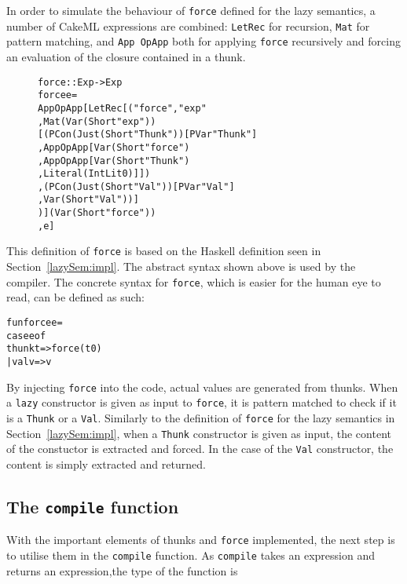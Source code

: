 In order to simulate the behaviour of \texttt{force} defined for the lazy
semantics, a number of CakeML expressions are combined:
\texttt{LetRec} for recursion, \texttt{Mat} for pattern
matching, and \texttt{App OpApp} both for applying \texttt{force} recursively
and forcing an evaluation of the closure contained in a thunk.

\begin{figure}[H]
\begin{alltt}
force :: Exp -> Exp
force e =
  App OpApp [LetRec [("force", "exp"
                     , Mat (Var (Short "exp"))
                       [(PCon (Just (Short "Thunk")) [PVar "Thunk"]
                        , App OpApp [Var (Short "force")
                                    , App OpApp [Var (Short "Thunk")
                                                , Literal (IntLit 0)]])
                       ,(PCon (Just (Short "Val")) [PVar "Val"]
                        , Var (Short "Val"))]
                     )] (Var (Short "force"))
            , e]
\end{alltt}
\end{figure}

\noindent This definition of \texttt{force} is based on the Haskell definition
seen in Section~\ref{lazySem:impl}. The abstract syntax shown above is used by
the compiler. The concrete syntax for \texttt{force}, which is easier for the
human eye to read, can be defined as such:

\begin{alltt}
fun force e =
  case e of
    thunk t => force (t 0)
    | val v => v
\end{alltt}


\noindent By injecting \texttt{force} into the code, actual values are generated
from thunks. When a \texttt{lazy} constructor is given
as input to \texttt{force}, it is pattern matched to check if it is a
\texttt{Thunk} or a \texttt{Val}. Similarly to the definition of \texttt{force}
for the lazy semantics in Section~\ref{lazySem:impl}, when a \texttt{Thunk}
constructor is given as input, the content of the constuctor is extracted and
forced. In the case of the \texttt{Val} constructor, the content is simply
extracted and returned.

\subsection{The \texttt{compile} function}
With the important elements of thunks and \texttt{force} implemented, the next
step is to utilise them in the \texttt{compile} function. 
As \texttt{compile} takes an expression and returns an expression,the type of
the function is

